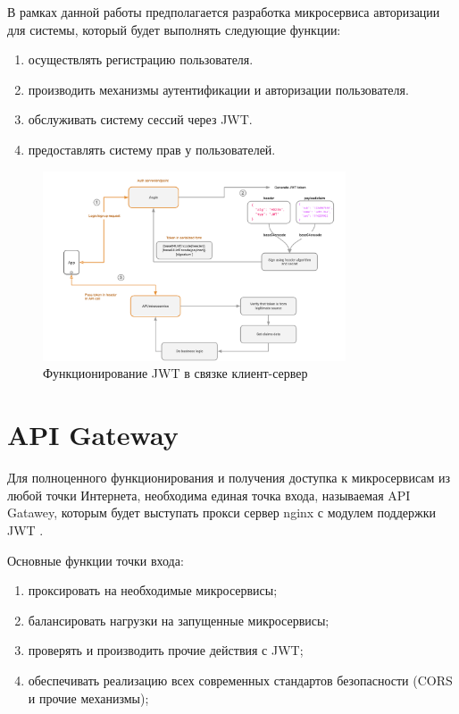 В рамках данной работы предполагается разработка микросервиса авторизации для системы, который будет выполнять следующие функции:

\begin{enumerate}
    \item осуществлять регистрацию пользователя.
    \item производить механизмы аутентификации и авторизации пользователя.
    \item обслуживать систему сессий через JWT.
    \item предоставлять систему прав у пользователей.
\end{enumerate}

\begin{figure}
  \centering
  \includegraphics[width=0.8\textwidth]{graphics/img/jwt.png}
  \caption{Функционирование JWT в связке клиент-сервер}
  \label{fig:jwt}
\end{figure}


\section{API Gateway}
Для полноценного функционирования и получения доступка к микросервисам из любой точки Интернета, необходима единая точка входа, называемая API Gatawey, которым будет выступать прокси сервер nginx с модулем поддержки JWT \cite{arch:api}. 

Основные функции точки входа:
\begin{enumerate}
    \item проксировать на необходимые микросервисы;
    \item балансировать нагрузки на запущенные микросервисы;
    \item проверять и производить прочие действия с JWT;
    \item обеспечивать реализацию всех современных стандартов безопасности (CORS и прочие механизмы);
\end{enumerate}

